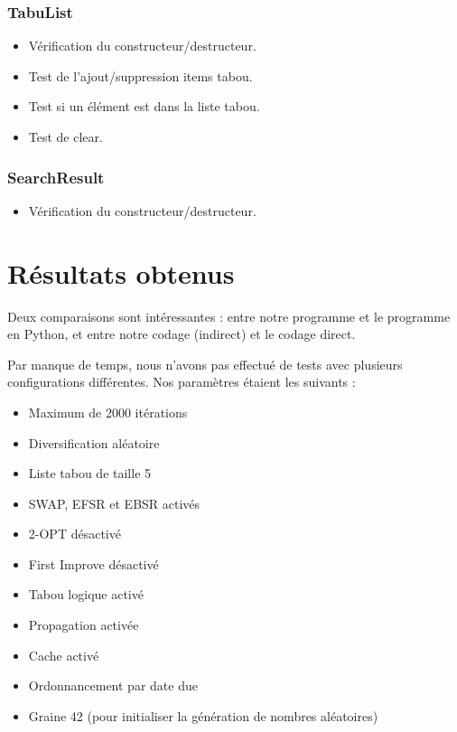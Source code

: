 \documentclass[hideweeklyreports]{polytech/polytech}
\begin{document}
			\subsection{TabuList}
				\begin{itemize}
					\item Vérification du constructeur/destructeur.
					\item Test de l'ajout/suppression items tabou.
					\item Test si un élément est dans la liste tabou.
					\item Test de clear.
				\end{itemize}
				
			\subsection{SearchResult}
				\begin{itemize}
					\item Vérification du constructeur/destructeur.
				\end{itemize}
		
	\chapter{Résultats obtenus}
		Deux comparaisons sont intéressantes : entre notre programme et le programme en Python, et entre notre codage (indirect) et le codage direct.
		
		Par manque de temps, nous n'avons pas effectué de tests avec plusieurs configurations différentes. Nos paramètres étaient les suivants :
		\begin{itemize}
			\item Maximum de 2000 itérations
			\item Diversification aléatoire
			\item Liste tabou de taille 5
			\item SWAP, EFSR et EBSR activés
			\item 2-OPT désactivé
			\item First Improve désactivé
			\item Tabou logique activé
			\item Propagation activée
			\item Cache activé
			\item Ordonnancement par date due
			\item Graine 42 (pour initialiser la génération de nombres aléatoires)
		\end{itemize}
		
\end{document}
